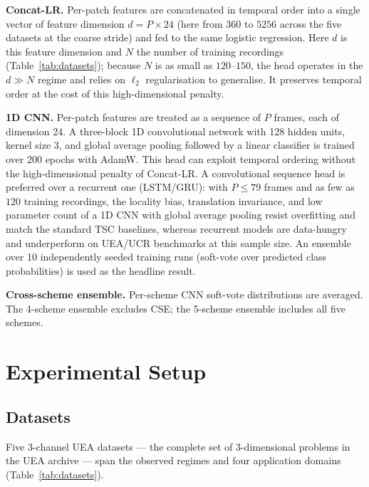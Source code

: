 \documentclass[conference,compsoc]{IEEEtran}
\begin{document}
\textbf{Concat-LR.}
Per-patch features are concatenated in temporal order into a single
vector of feature dimension $d = P \times 24$ (here from $360$ to
$5256$ across the five datasets at the coarse stride) and fed to the
same logistic regression. Here $d$ is this feature dimension and $N$
the number of training recordings (Table~\ref{tab:datasets}); because
$N$ is as small as $120$--$150$, the head operates in the $d \gg N$
regime and relies on $\ell_2$ regularisation to generalise.
It preserves temporal order at the cost of this high-dimensional
penalty.

\textbf{1D CNN.}
Per-patch features are treated as a sequence of $P$ frames, each of
dimension 24.
A three-block 1D convolutional network with 128 hidden units,
kernel size 3, and global average pooling followed by a linear
classifier is trained over 200 epochs with AdamW.
This head can exploit temporal ordering without the high-dimensional
penalty of Concat-LR.
A convolutional sequence head is preferred over a recurrent one
(LSTM/GRU): with $P \le 79$ frames and as few as $120$ training
recordings, the locality bias, translation invariance, and low
parameter count of a 1D CNN with global average pooling resist
overfitting and match the standard TSC baselines, whereas recurrent
models are data-hungry and underperform on UEA/UCR benchmarks at this
sample size.
An ensemble over 10 independently seeded training runs (soft-vote
over predicted class probabilities) is used as the headline result.

\textbf{Cross-scheme ensemble.}
Per-scheme CNN soft-vote distributions are averaged.
The 4-scheme ensemble excludes CSE;
the 5-scheme ensemble includes all five schemes.

\section{Experimental Setup}
\label{sec:experiments}

\subsection{Datasets}

Five 3-channel UEA datasets --- the complete set of 3-dimensional
problems in the UEA archive --- span the observed regimes and four
application domains (Table~\ref{tab:datasets}).
\end{document}

